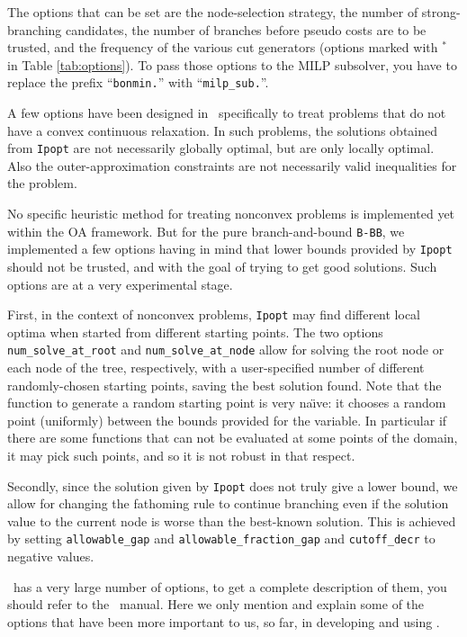 The options that can be set are the node-selection strategy, the number of strong-branching candidates,
the number of branches before pseudo costs are to be trusted, and the frequency of the various cut generators
(options marked with $^*$ in Table \ref{tab:options}). To pass those options to the MILP subsolver, you have
to replace the prefix ``{\tt bonmin.}'' with ``{\tt milp\_sub.}''.


\label{sec:non_convex}
A few options have been designed in \Bonmin\ specifically to treat
problems that do not have a convex continuous relaxation.
In such problems, the solutions obtained from {\tt Ipopt} are
not necessarily globally optimal, but are only locally optimal. Also the outer-approximation
constraints are not necessarily valid inequalities for the problem.

No specific heuristic method for treating nonconvex problems is implemented
yet within the OA framework.
But for the pure branch-and-bound {\tt B-BB}, we implemented a few options having
in mind that lower bounds provided by {\tt Ipopt} should not be trusted, and with the goal of
trying to get good solutions. Such options are at a very experimental stage.

First, in the context of nonconvex problems, {\tt Ipopt} may find different local optima when started
from different starting points. The two options {\tt num\_solve\_at\_root} and {\tt num\_solve\_at\_node}
allow for solving the root node or each node of the tree, respectively, with a user-specified
number of different randomly-chosen
starting points, saving the best solution found. Note that the function to generate a random starting point
is very na\"{\i}ve: it chooses a random point (uniformly) between the bounds provided for the variable.
In particular if there are some functions
that can not be evaluated at some points of the domain, it may pick such points,
 and so it is not robust in that respect.

Secondly, since the solution given by {\tt Ipopt} does not truly give a lower bound, we allow for
changing the fathoming rule
to continue branching even if the solution value to the current node is worse
than the best-known
solution. This is achieved by setting {\tt allowable\_gap}
and {\tt allowable\_fraction\_gap} and {\tt cutoff\_decr} to negative values.

\Ipopt\ has a very large number of options, to get a complete description of them, you
should refer to the \Ipopt\ manual.
Here we only mention and explain some of the options that have been more important to us, so far,
in developing and using \Bonmin.

